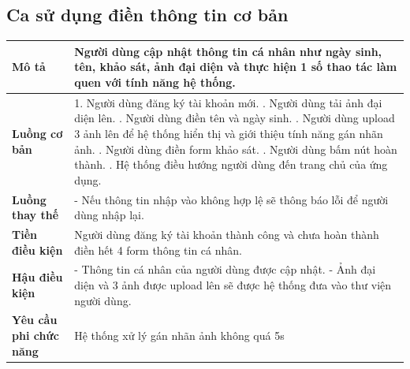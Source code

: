 \subsection{Ca sử dụng điền thông tin cơ bản}

\vspace{0.5cm}


\noindent 
\begin{tabularx}{\linewidth}{| l | X |} 
\hline 
\textbf{Mô tả} & Người dùng cập nhật thông tin cá nhân như ngày sinh, tên, khảo sát, ảnh đại diện và thực hiện 1 số thao tác làm quen với tính năng hệ thống. \\ 
\hline 
\textbf{Luồng cơ bản} & 1. Người dùng đăng ký tài khoản mới. \newline
                       2. Người dùng tải ảnh đại diện lên. \newline
                       3. Người dùng điền tên và ngày sinh. \newline
                       4. Người dùng upload 3 ảnh lên để hệ thống hiển thị và giới thiệu tính năng gán nhãn ảnh. \newline
                       5. Người dùng điền form khảo sát. \newline
                       6. Người dùng bấm nút hoàn thành. \newline
                       7. Hệ thống điều hướng người dùng đến trang chủ của ứng dụng. \\
\hline 
\textbf{Luồng thay thế} &
                       - Nếu thông tin nhập vào không hợp lệ sẽ thông báo lỗi để người dùng nhập lại. \\ 
\hline 
\textbf{Tiền điều kiện} & Người dùng đăng ký tài khoản thành công và chưa hoàn thành điền hết 4 form thông tin cá nhân. \\
\hline 
\textbf{Hậu điều kiện} & - Thông tin cá nhân của người dùng được cập nhật. \newline
                       - Ảnh đại diện và 3 ảnh được upload lên sẽ được hệ thống đưa vào thư viện người dùng. \\ 
\hline 
\textbf{Yêu cầu phi chức năng} & Hệ thống xử lý gán nhãn ảnh không quá 5s \\
\hline 
\end{tabularx}

\vspace{0.8cm}

